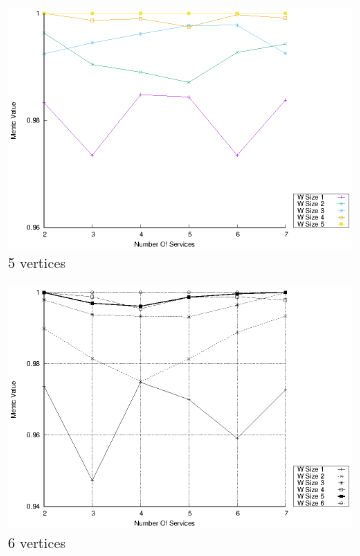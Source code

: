 \begin{figure}[!htb]
\begin{subfigure}{0.33\textwidth}
    \includegraphics[width=\textwidth]{Images/graphs/window_quality_performance_diff_qual_n7_s7_50_80_n5}
    \caption{5 vertices}
    \label{fig:quality_window_average_qualitative_n5}
  \end{subfigure}
  \hfill
  \begin{subfigure}{0.33\textwidth}
    \includegraphics[width=\textwidth]{Images/graphs/window_quality_performance_diff_qual_n7_s7_50_80_n6}
    \caption{6 vertices}
    \label{fig:quality_window_average_qualitative_n6}
  \end{subfigure}
  \begin{subfigure}{0.33\textwidth}

\end{subfigure}
\end{figure}
